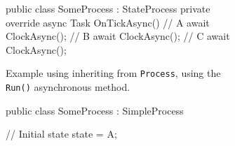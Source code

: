 \begin{figure}
    \begin{subfigure}[b]{0.3\textwidth}
        \centering
\begin{mintedcsharp}
public class SomeProcess : StateProcess
{
  private override async Task OnTickAsync()
  {
    // A
    await ClockAsync();
    // B
    await ClockAsync();
    // C
    await ClockAsync();
  }
}
\end{mintedcsharp}
        \caption{Example using inheriting from \texttt{Process}, using the \texttt{Run()} asynchronous method.}
	\label{fig:sme_example_process_async_code}
    \end{subfigure}
\hfill
    \begin{subfigure}[b]{0.3\textwidth}
\begin{mintedcsharp}
public class SomeProcess : SimpleProcess
{
// Initial state
state = A;

}
\end{mintedcsharp}
\end{subfigure}
\end{figure}
